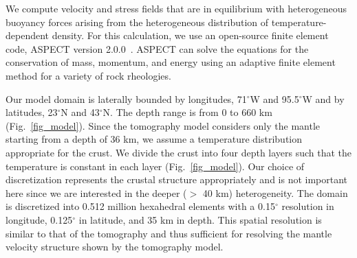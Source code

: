 \documentclass[draft,linenumbers]{agujournal2018}
\begin{document}
    We compute velocity and stress fields that are in equilibrium with heterogeneous buoyancy forces arising from the heterogeneous distribution of temperature-dependent density. For this calculation, we use an open-source finite element code, ASPECT version 2.0.0~\citep{heister_aspect_methods2,KHB12,aspect-doi-v2.0.0}. ASPECT can solve the equations for the conservation of mass, momentum, and energy using an adaptive finite element method for a variety of rock rheologies. 
    
     Our model domain is laterally bounded by longitudes, 71$^{\circ}$W and 95.5$^{\circ}$W and by latitudes, 23$^{\circ}$N and 43$^{\circ}$N. The depth range is from 0 to 660 km (Fig.~\ref{fig_model}). Since the tomography model considers only the mantle starting from a depth of 36 km, we assume a temperature distribution appropriate for the crust. We divide the crust into four depth layers such that the temperature is constant in each layer (Fig.~\ref{fig_model}). Our choice of discretization represents the crustal structure appropriately and is not important here since we are interested in the deeper ($>$ 40 km) heterogeneity. The domain is discretized into 0.512 million hexahedral elements with a 0.15$^{\circ}$ resolution in longitude, 0.125$^{\circ}$ in latitude, and 35 km in depth. This spatial resolution is similar to that of the tomography and thus sufficient for resolving the mantle velocity structure shown by the tomography model. 
\end{document}
